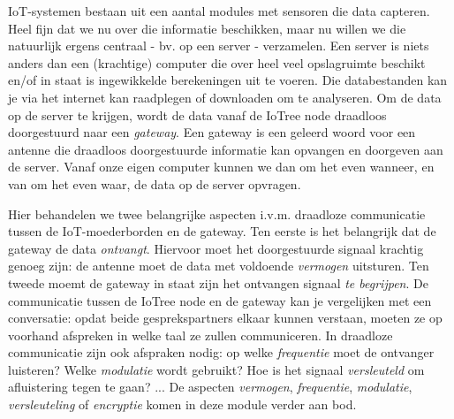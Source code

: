 

IoT-systemen bestaan uit een aantal modules met sensoren die data capteren. Heel fijn dat we nu over die informatie beschikken, maar nu willen we die natuurlijk ergens centraal - bv. op een server - verzamelen. Een server is niets anders dan een (krachtige) computer die over heel veel opslagruimte beschikt en/of in staat is ingewikkelde berekeningen uit te voeren. Die databestanden kan je via het internet kan raadplegen of downloaden om te analyseren. Om de data op de server te krijgen, wordt de data vanaf de IoTree node draadloos doorgestuurd naar een \emph{gateway}. Een gateway is een geleerd woord voor een antenne die draadloos doorgestuurde informatie kan opvangen en doorgeven aan de server. Vanaf onze eigen computer kunnen we dan om het even wanneer, en van om het even waar, de data op de server opvragen.

Hier behandelen we twee belangrijke aspecten i.v.m. draadloze communicatie tussen de IoT-moederborden en de gateway. Ten eerste is het belangrijk dat de gateway de data \emph{ontvangt}. Hiervoor moet het doorgestuurde signaal krachtig genoeg zijn: de antenne moet de data met voldoende \emph{vermogen} uitsturen. Ten tweede moemt de gateway in staat zijn het ontvangen signaal \emph{te begrijpen}. De communicatie tussen de IoTree node en de gateway kan je vergelijken met een conversatie: opdat beide gesprekspartners elkaar kunnen verstaan, moeten ze op voorhand afspreken in welke taal ze zullen communiceren. In draadloze communicatie zijn ook afspraken nodig: op welke \emph{frequentie} moet de ontvanger luisteren? Welke \emph{modulatie} wordt gebruikt? Hoe is het signaal \emph{versleuteld} om afluistering tegen te gaan? ... De aspecten \emph{vermogen}, \emph{frequentie}, \emph{modulatie}, \emph{versleuteling} of \emph{encryptie} komen in deze module verder aan bod.

